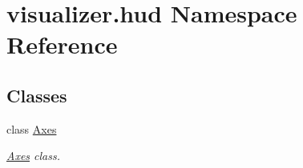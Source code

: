 \hypertarget{namespacevisualizer_1_1hud}{}\section{visualizer.\+hud Namespace Reference}
\label{namespacevisualizer_1_1hud}
\subsection*{Classes}
\begin{DoxyCompactItemize}
\item 
class \hyperlink{classvisualizer_1_1hud_1_1Axes}{Axes}
\begin{DoxyCompactList}\small\item\em \hyperlink{classvisualizer_1_1hud_1_1Axes}{Axes} class. \end{DoxyCompactList}\end{DoxyCompactItemize}

